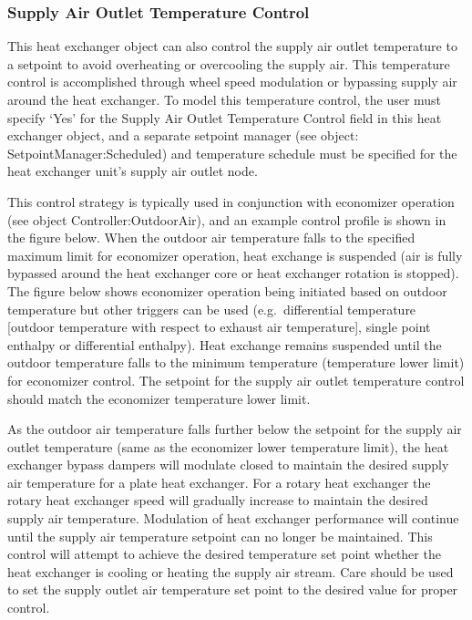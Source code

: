 \subsubsection{Supply Air Outlet Temperature Control}\label{supply-air-outlet-temperature-control}

This heat exchanger object can also control the supply air outlet temperature to a setpoint to avoid overheating or overcooling the supply air. This temperature control is accomplished through wheel speed modulation or bypassing supply air around the heat exchanger. To model this temperature control, the user must specify `Yes' for the Supply Air Outlet Temperature Control field in this heat exchanger object, and a separate setpoint manager (see object: SetpointManager:Scheduled) and temperature schedule must be specified for the heat exchanger unit's supply air outlet node.

This control strategy is typically used in conjunction with economizer operation (see object Controller:OutdoorAir), and an example control profile is shown in the figure below. When the outdoor air temperature falls to the specified maximum limit for economizer operation, heat exchange is suspended (air is fully bypassed around the heat exchanger core or heat exchanger rotation is stopped). The figure below shows economizer operation being initiated based on outdoor temperature but other triggers can be used (e.g.~differential temperature {[}outdoor temperature with respect to exhaust air temperature{]}, single point enthalpy or differential enthalpy). Heat exchange remains suspended until the outdoor temperature falls to the minimum temperature (temperature lower limit) for economizer control. The setpoint for the supply air outlet temperature control should match the economizer temperature lower limit.

As the outdoor air temperature falls further below the setpoint for the supply air outlet temperature (same as the economizer lower temperature limit), the heat exchanger bypass dampers will modulate closed to maintain the desired supply air temperature for a plate heat exchanger. For a rotary heat exchanger the rotary heat exchanger speed will gradually increase to maintain the desired supply air temperature. Modulation of heat exchanger performance will continue until the supply air temperature setpoint can no longer be maintained. This control will attempt to achieve the desired temperature set point whether the heat exchanger is cooling or heating the supply air stream. Care should be used to set the supply outlet air temperature set point to the desired value for proper control.

